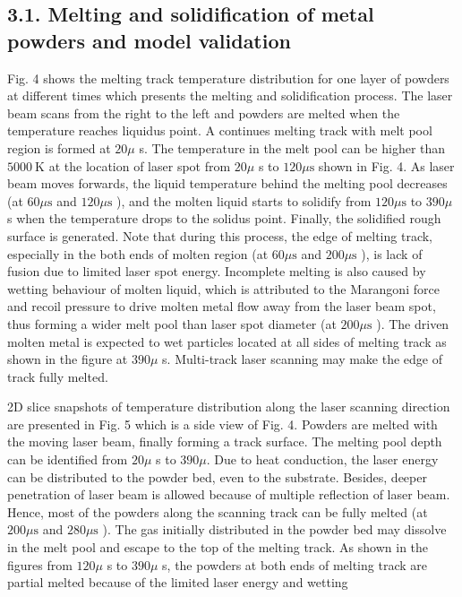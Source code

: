 \documentclass[10pt]{article}
\begin{document}
\subsection*{3.1. Melting and solidification of metal powders and model validation}
Fig. 4 shows the melting track temperature distribution for one layer of powders at different times which presents the melting and solidification process. The laser beam scans from the right to the left and powders are melted when the temperature reaches liquidus point. A continues melting track with melt pool region is formed at $20 \mu$ s. The temperature in the melt pool can be higher than $5000 \mathrm{~K}$ at the location of laser spot from $20 \mu$ s to $120 \mu \mathrm{s}$ shown in Fig. 4. As laser beam moves forwards, the liquid temperature behind the melting pool decreases (at $60 \mu \mathrm{s}$ and $120 \mu \mathrm{s}$ ), and the molten liquid starts to solidify from $120 \mu \mathrm{s}$ to $390 \mu$ s when the temperature drops to the solidus point. Finally, the solidified rough surface is generated. Note that during this process, the edge of melting track, especially in the both ends of molten region (at $60 \mu \mathrm{s}$ and $200 \mu \mathrm{s}$ ), is lack of fusion due to limited laser spot energy. Incomplete melting is also caused by wetting behaviour of molten liquid, which is attributed to the Marangoni force and recoil pressure to drive molten metal flow away from the laser beam spot, thus forming a wider melt pool than laser spot diameter (at $200 \mu \mathrm{s}$ ). The driven molten metal is expected to wet particles located at all sides of melting track as shown in the figure at $390 \mu$ s. Multi-track laser scanning may make the edge of track fully melted.

2D slice snapshots of temperature distribution along the laser scanning direction are presented in Fig. 5 which is a side view of Fig. 4. Powders are melted with the moving laser beam, finally forming a track surface. The melting pool depth can be identified from $20 \mu$ s to $390 \mu$. Due to heat conduction, the laser energy can be distributed to the powder bed, even to the substrate. Besides, deeper penetration of laser beam is allowed because of multiple reflection of laser beam. Hence, most of the powders along the scanning track can be fully melted (at $200 \mu \mathrm{s}$ and $280 \mu \mathrm{s}$ ). The gas initially distributed in the powder bed may dissolve in the melt pool and escape to the top of the melting track. As shown in the figures from $120 \mu$ s to $390 \mu$ s, the powders at both ends of melting track are partial melted because of the limited laser energy and wetting
\end{document}
